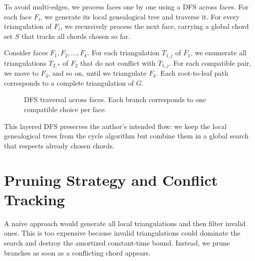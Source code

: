 \documentclass[12pt,a4paper]{report}
\theoremstyle{definition}
\theoremstyle{remark}
\newcommand{\Graph}{G}
\newcommand{\ChordSet}{S}
\begin{document}
To avoid multi-edges, we process faces one by one using a DFS across faces. For each
face $F_i$, we generate its local genealogical tree and traverse it. For every
triangulation of $F_i$, we recursively process the next face, carrying a global chord
set $\ChordSet$ that tracks all chords chosen so far.

Consider faces $F_1, F_2, \ldots, F_k$. For each triangulation $T_{1,j}$ of $F_1$, we
enumerate all triangulations $T_{2,*}$ of $F_2$ that do not conflict with $T_{1,j}$.
For each compatible pair, we move to $F_3$, and so on, until we triangulate $F_k$. Each
root-to-leaf path corresponds to a complete triangulation of $\Graph$.

\begin{figure}[h]
    \centering
    \caption{DFS traversal across faces. Each branch corresponds to one compatible choice per face.}
    \label{fig:face_dfs}
\end{figure}

This layered DFS preserves the author's intended flow: we keep the local genealogical
trees from the cycle algorithm but combine them in a global search that respects already
chosen chords.

\chapter{Pruning Strategy and Conflict Tracking}
\label{chap:pruning}

A naive approach would generate all local triangulations and then filter invalid ones.
This is too expensive because invalid triangulations could dominate the search and destroy
the amortized constant-time bound. Instead, we prune branches as soon as a conflicting
chord appears.
\end{document}
